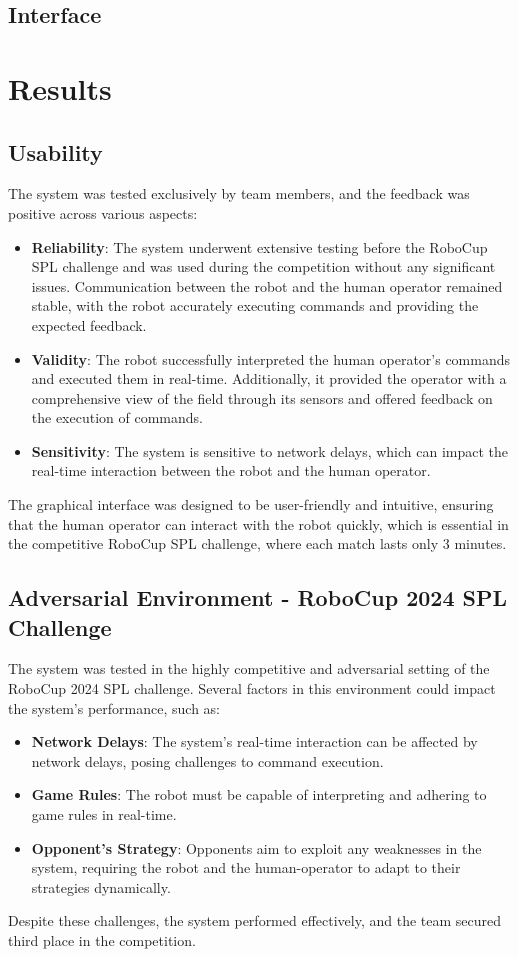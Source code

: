 \documentclass[a4paper, onecolumn, 12pt]{article}
\begin{document}
\subsection{Interface}


\section{Results}
\label{sec:res}
\subsection{Usability}  
The system was tested exclusively by team members, and the feedback was positive 
across various aspects:  
\begin{itemize}  
    \item \textbf{Reliability}: The system underwent extensive testing before the RoboCup 
    SPL challenge and was used during the competition without any significant issues. 
    Communication between the robot and the human operator remained stable, with the 
    robot accurately executing commands and providing the expected feedback.  
    \item \textbf{Validity}: The robot successfully interpreted the human operator's 
    commands and executed them in real-time. Additionally, it provided the operator with a comprehensive view of the field through its sensors and offered feedback on the execution of commands.  
    \item \textbf{Sensitivity}: The system is sensitive to network delays, which can 
    impact the real-time interaction between the robot and the human operator.  
\end{itemize}  

The graphical interface was designed to be user-friendly and intuitive, ensuring that 
the human operator can interact with the robot quickly, which is essential in the 
competitive RoboCup SPL challenge, where each match lasts only 3 minutes.  

\subsection{Adversarial Environment - RoboCup 2024 SPL Challenge}  
The system was tested in the highly competitive and adversarial setting of the RoboCup 
2024 SPL challenge. Several factors in this environment could impact the system’s 
performance, such as:  
\begin{itemize}  
    \item \textbf{Network Delays}: The system’s real-time interaction can be affected 
    by network delays, posing challenges to command execution.  
    \item \textbf{Game Rules}: The robot must be capable of interpreting and adhering 
    to game rules in real-time.  
    \item \textbf{Opponent's Strategy}: Opponents aim to exploit any weaknesses in the 
    system, requiring the robot and the human-operator to adapt to their strategies dynamically.  
\end{itemize}  
Despite these challenges, the system performed effectively, and the team secured third 
place in the competition.  
\end{document}
